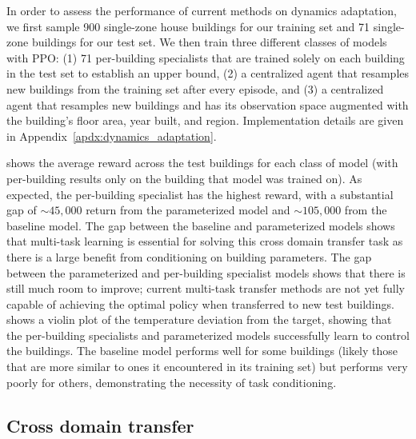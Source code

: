 \documentclass[10pt]{article} %
\begin{document}
\begin{itemize}
In order to assess the performance of current methods on dynamics adaptation, we first sample 900 single-zone house buildings for our training set and 71 single-zone buildings for our test set. We then train three different classes of models with PPO: (1) 71 per-building specialists that are trained solely on each building in the test set to establish an upper bound, (2) a centralized agent that resamples new buildings from the training set after every episode, and (3) a centralized agent that resamples new buildings and has its observation space augmented with the building's floor area, year built, and region. Implementation details are given in Appendix~\ref{apdx:dynamics_adaptation}.

 shows the average reward across the test buildings for each class of model (with per-building results only on the building that model was trained on). As expected, the per-building specialist has the highest reward, with a substantial gap of $\sim45,000$ return from the parameterized model and $\sim105,000$ from the baseline model. The gap between the baseline and parameterized models shows that multi-task learning is essential for solving this cross domain transfer task as there is a large benefit from conditioning on building parameters. The gap between the parameterized and per-building specialist models shows that there is still much room to improve; current multi-task transfer methods are not yet fully capable of achieving the optimal policy when transferred to new test buildings.  shows a violin plot of the temperature deviation from the target, showing that the per-building specialists and parameterized models successfully learn to control the buildings. The baseline model performs well for some buildings (likely those that are more similar to ones it encountered in its training set) but performs very poorly for others, demonstrating the necessity of task conditioning.


\subsection{Cross domain transfer}



\end{itemize}
\end{document}
